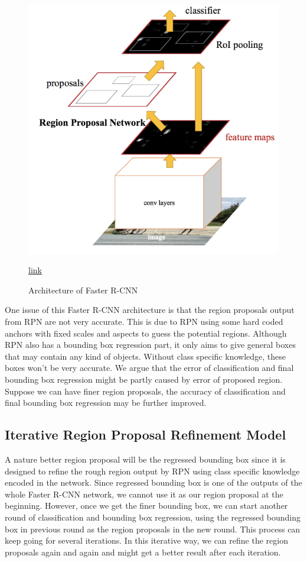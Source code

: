 \begin{figure}
	\centering
	\includegraphics[width=\linewidth]{img7}
	\caption{Architecture of Faster R-CNN} \href{https://medium.com/@tanaykarmarkar/region-proposal-network-rpn-backbone-of-faster-r-cnn-4a744a38d7f9}{link}
	\label{fig:img7}
\end{figure}

One issue of this Faster R-CNN architecture is that the region proposals output from RPN are not very accurate. This is due to RPN using some hard coded anchors with fixed scales and aspects to guess the potential regions. Although RPN also has a bounding box regression part, it only aims to give general boxes that may contain any kind of objects. Without class specific knowledge, these boxes won’t be very accurate. We argue that the error of classification and final bounding box regression might be partly caused by error of proposed region. Suppose we can have finer region proposals, the accuracy of classification and final bounding box regression may be further improved.

\subsection{Iterative Region Proposal Refinement Model}
A nature better region proposal will be the regressed bounding box since it is designed to refine the rough region output by RPN using class specific knowledge encoded in the network. Since regressed bounding box is one of the outputs of the whole Faster R-CNN network, we cannot use it as our region proposal at the beginning. However, once we get the finer bounding box, we can start another round of classification and bounding box regression, using the regressed bounding box in previous round as the region proposals in the new round. This process can keep going for several iterations. In this iterative way, we can refine the region proposals again and again and might get a better result after each iteration.

